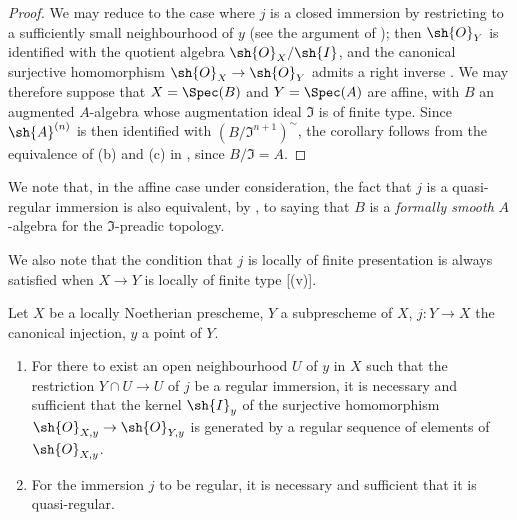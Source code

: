 \begin{proof}
We may reduce to the case where $j$ is a closed immersion by restricting to a sufficiently small neighbourhood of $y$ (see the argument of ); then $\sh{O}_Y$ is identified with the quotient algebra $\sh{O}_X/\sh{I}$, and the canonical surjective homomorphism $\sh{O}_X \to \sh{O}_Y$ admits a
right inverse .
We may therefore suppose that $X = \Spec(B)$ and $Y = \Spec(A)$ are affine, with $B$ an augmented $A$-algebra whose augmentation ideal $\mathfrak{I}$ is of finite type.
Since $\sh{A}^{(n)}$ is then identified with $(B/\mathfrak{I}^{n+1})^{\sim}$, the corollary follows from the equivalence of (b) and (c) in , since $B/\mathfrak{I} = A$.
\end{proof}

We note that, in the affine case under consideration, the fact that $j$ is a quasi-regular immersion is also equivalent, by , to saying that $B$ is a \emph{formally smooth} $A$-algebra for the $\mathfrak{I}$-preadic topology.

We also note that the condition that $j$ is locally of finite presentation is always satisfied when $X \to Y$ is locally of finite type [(v)].

\begin{proposition}[16.9.10]
\label{IV.16.9.10}
Let $X$ be a locally Noetherian prescheme, $Y$ a subprescheme of $X$, $j:Y \to X$ the canonical injection, $y$ a point of $Y$.
\begin{enumerate}
  \item[\rm{(i)}] For there to exist an open neighbourhood $U$ of $y$ in $X$ such that the restriction $Y \cap U \to U$ of $j$ be a regular immersion, it is necessary and sufficient that the kernel $\sh{I}_y$ of the surjective homomorphism $\sh{O}_{X,y} \to \sh{O}_{Y,y}$ is generated by a regular sequence of elements of $\sh{O}_{X,y}$.

  \item[\rm{(ii)}] For the immersion $j$ to be regular, it is necessary and sufficient that it is quasi-regular.
\end{enumerate}
\end{proposition}

